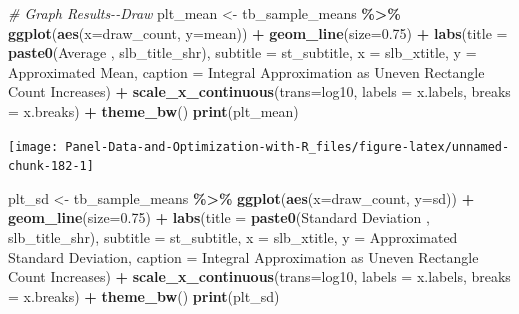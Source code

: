 \documentclass[
]{book}
\newenvironment{Shaded}{\begin{snugshade}}{\end{snugshade}}
\newcommand{\CommentTok}[1]{\textcolor[rgb]{0.56,0.35,0.01}{\textit{#1}}}
\newcommand{\DataTypeTok}[1]{\textcolor[rgb]{0.13,0.29,0.53}{#1}}
\newcommand{\FloatTok}[1]{\textcolor[rgb]{0.00,0.00,0.81}{#1}}
\newcommand{\KeywordTok}[1]{\textcolor[rgb]{0.13,0.29,0.53}{\textbf{#1}}}
\newcommand{\NormalTok}[1]{#1}
\newcommand{\OperatorTok}[1]{\textcolor[rgb]{0.81,0.36,0.00}{\textbf{#1}}}
\newcommand{\StringTok}[1]{\textcolor[rgb]{0.31,0.60,0.02}{#1}}
\begin{document}
\begin{Shaded}
\begin{Highlighting}[]
\CommentTok{\# Graph Results{-}{-}Draw}
\NormalTok{plt\_mean \textless{}{-}}\StringTok{ }\NormalTok{tb\_sample\_means }\OperatorTok{\%\textgreater{}\%}
\StringTok{  }\KeywordTok{ggplot}\NormalTok{(}\KeywordTok{aes}\NormalTok{(}\DataTypeTok{x=}\NormalTok{draw\_count, }\DataTypeTok{y=}\NormalTok{mean)) }\OperatorTok{+}
\StringTok{  }\KeywordTok{geom\_line}\NormalTok{(}\DataTypeTok{size=}\FloatTok{0.75}\NormalTok{) }\OperatorTok{+}
\StringTok{  }\KeywordTok{labs}\NormalTok{(}\DataTypeTok{title =} \KeywordTok{paste0}\NormalTok{(}\StringTok{\textquotesingle{}Average \textquotesingle{}}\NormalTok{, slb\_title\_shr),}
       \DataTypeTok{subtitle =}\NormalTok{ st\_subtitle,}
       \DataTypeTok{x =}\NormalTok{ slb\_xtitle,}
       \DataTypeTok{y =} \StringTok{\textquotesingle{}Approximated Mean\textquotesingle{}}\NormalTok{,}
       \DataTypeTok{caption =} \StringTok{\textquotesingle{}Integral Approximation as Uneven Rectangle Count Increases\textquotesingle{}}\NormalTok{) }\OperatorTok{+}
\StringTok{  }\KeywordTok{scale\_x\_continuous}\NormalTok{(}\DataTypeTok{trans=}\StringTok{\textquotesingle{}log10\textquotesingle{}}\NormalTok{, }\DataTypeTok{labels =}\NormalTok{ x.labels, }\DataTypeTok{breaks =}\NormalTok{ x.breaks) }\OperatorTok{+}
\StringTok{  }\KeywordTok{theme\_bw}\NormalTok{()}
\KeywordTok{print}\NormalTok{(plt\_mean)}
\end{Highlighting}
\end{Shaded}

\begin{center}\texttt{[image: Panel-Data-and-Optimization-with-R\_files/figure-latex/unnamed-chunk-182-1]} \end{center}

\begin{Shaded}
\begin{Highlighting}[]
\NormalTok{plt\_sd \textless{}{-}}\StringTok{ }\NormalTok{tb\_sample\_means }\OperatorTok{\%\textgreater{}\%}
\StringTok{  }\KeywordTok{ggplot}\NormalTok{(}\KeywordTok{aes}\NormalTok{(}\DataTypeTok{x=}\NormalTok{draw\_count, }\DataTypeTok{y=}\NormalTok{sd)) }\OperatorTok{+}
\StringTok{  }\KeywordTok{geom\_line}\NormalTok{(}\DataTypeTok{size=}\FloatTok{0.75}\NormalTok{) }\OperatorTok{+}
\StringTok{  }\KeywordTok{labs}\NormalTok{(}\DataTypeTok{title =} \KeywordTok{paste0}\NormalTok{(}\StringTok{\textquotesingle{}Standard Deviation \textquotesingle{}}\NormalTok{, slb\_title\_shr),}
       \DataTypeTok{subtitle =}\NormalTok{ st\_subtitle,}
       \DataTypeTok{x =}\NormalTok{ slb\_xtitle,}
       \DataTypeTok{y =} \StringTok{\textquotesingle{}Approximated Standard Deviation\textquotesingle{}}\NormalTok{,}
       \DataTypeTok{caption =} \StringTok{\textquotesingle{}Integral Approximation as Uneven Rectangle Count Increases\textquotesingle{}}\NormalTok{) }\OperatorTok{+}
\StringTok{  }\KeywordTok{scale\_x\_continuous}\NormalTok{(}\DataTypeTok{trans=}\StringTok{\textquotesingle{}log10\textquotesingle{}}\NormalTok{, }\DataTypeTok{labels =}\NormalTok{ x.labels, }\DataTypeTok{breaks =}\NormalTok{ x.breaks) }\OperatorTok{+}
\StringTok{  }\KeywordTok{theme\_bw}\NormalTok{()}
\KeywordTok{print}\NormalTok{(plt\_sd)}
\end{Highlighting}
\end{Shaded}
\end{document}
